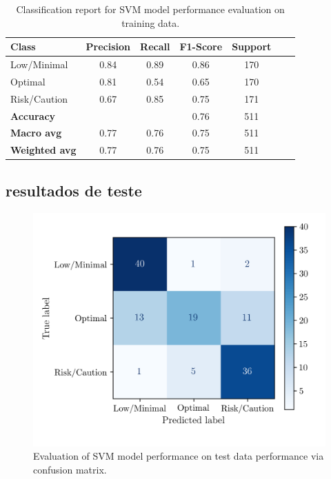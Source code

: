 \documentclass[conference]{IEEEtran}
\begin{document}
\begin{table}[H]
\centering
\caption{Classification report for SVM model performance evaluation on training data.}
\begin{tabular}{lcccccc}
\toprule
\textbf{Class} & \textbf{Precision} & \textbf{Recall} & \textbf{F1-Score} & \textbf{Support} \\
\midrule
Low/Minimal & 0.84 & 0.89 & 0.86 & 170 \\
Optimal & 0.81 & 0.54 & 0.65 & 170 \\
Risk/Caution & 0.67 & 0.85 & 0.75 & 171 \\
\midrule
\textbf{Accuracy} &  &  & 0.76 & 511 \\
\textbf{Macro avg} & 0.77 & 0.76 & 0.75 & 511 \\
\textbf{Weighted avg} & 0.77 & 0.76 & 0.75 & 511 \\
\bottomrule
\end{tabular}
\end{table}


\subsection{resultados de teste}

\begin{figure}[H]
    \centering
    \includegraphics[width=1\linewidth]{assets/SVM_ConfusionMatrixTest.png}
    \caption{Evaluation of SVM model performance on test data performance via confusion matrix.}
    \label{svm_cm_test}
\end{figure}
\end{document}
